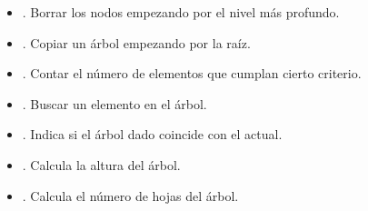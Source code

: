\begin{itemize}

	
\item {}. Borrar los nodos empezando por el nivel más profundo.

\item {}. Copiar un árbol empezando por la raíz.

\item {}. Contar el número de elementos que cumplan cierto criterio.

\item {}.   Buscar un elemento en el árbol.

\item {}. Indica si el árbol dado coincide con el actual.

\item {}. Calcula la altura del árbol.

\item {}. Calcula el número de hojas del árbol.

\end{itemize}


